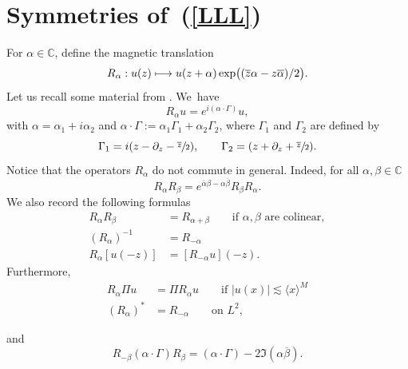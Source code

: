 \documentclass[10pt]{amsart}
\newcommand\mto{\mathchoice{\longmapsto}{\mapsto}{\mapsto}{\mapsto}}
\theoremstyle{definition}
\let\EE\exp
\let\ov\overline
\newcommand\C{\mathbb C}
\begin{document}
\section{Symmetries of~(\ref{LLL})}
For $\alpha \in \C$, define the magnetic translation
\begin{equation*}
R_{\alpha}: u (z) \mto u(z+\alpha) \EE\bigl((\overline z \alpha - z \overline{\alpha})/2\bigr).
\end{equation*}
Let us recall some material from \cite[App.\,A]{SchTho}. We~have
\begin{equation*}
R_{\alpha}u=e^{i(\alpha \cdot \Gamma)}u,
\end{equation*}
with $\alpha=\alpha_1+i\alpha_2$ and $\alpha \cdot \Gamma:= \alpha_1 \Gamma_1 +\alpha_2 \Gamma_2$, where $\Gamma_1$ and $\Gamma_2$ are defined by
\begin{equation}\label{infinitesimal}
\Gamma_1=i(z -\partial_z-\sfrac{\ov z}2), \qquad \Gamma_2=(z +\partial_z+\sfrac{\ov z}2).
\end{equation}
Notice that the operators $R_{\alpha}$ do not commute in general. Indeed, for all $\alpha, \beta \in \C$
\begin{equation}\label{commut}
R_{\alpha} R_\beta = e^{ {\ov \alpha} \beta-\alpha \ov{\beta} } R_{\beta} R_{\alpha}.
\end{equation}
We also record the following formulas
\begin{equation}
\label{propRalpha}
\begin{split}
R_\alpha R_\beta &= R_{\alpha + \beta} \qquad \text{if $\alpha,\beta$ are colinear}, \\
(R_\alpha)^{-1} &= R_{-\alpha} \\
R_\alpha [ u(-z) ] &= [R_{-\alpha} u](-z).
\end{split}
\end{equation}
Furthermore,\vspace*{-3pt}
\begin{align}\label{com0}
R_\alpha \Pi u &= \Pi R_\alpha u \qquad \text{if $|u(x)| \lesssim \langle x \rangle^M$} \\
(R_\alpha)^* &= R_{-\alpha} \qquad \text{on $L^2$}, \nonumber
\end{align}
\vspace*{-1.5\baselineskip}
\par\noindent
and\vspace*{-3pt}
\begin{equation}
\label{r-1}
R_{-\beta} (\alpha \cdot \Gamma) R_\beta =(\alpha \cdot \Gamma) -2 \Im(\alpha \ov{\beta}).
\end{equation}
\end{document}
